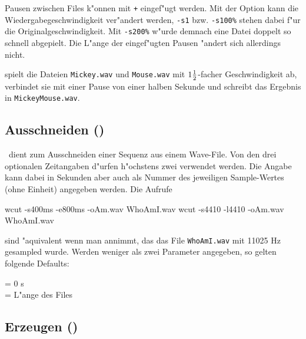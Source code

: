 Pausen zwischen Files k"onnen mit {\tt +} eingef"ugt
werden. Mit der Option  kann die 
Wiedergabegeschwindigkeit ver"andert werden, {\tt -s1} bzw.
{\tt -s100\%} stehen dabei f"ur die Originalgeschwindigkeit.
Mit {\tt -s200\%} w"urde demnach eine Datei doppelt so schnell
abgepielt. Die L"ange der eingef"ugten Pausen "andert sich
allerdings nicht.


\noindent spielt die Dateien {\tt Mickey.wav} und {\tt Mouse.wav}
mit $1{{1 \over 2}}$-facher Geschwindigkeit ab, verbindet sie
mit einer Pause von einer halben Sekunde und schreibt das
Ergebnis in {\tt MickeyMouse.wav}.


\subsection{Ausschneiden (\wcut)}



\wcut\ dient zum Ausschneiden einer Sequenz aus einem Wave-File.
Von den drei optionalen Zeitangaben d"urfen h"ochstens zwei 
verwendet werden. Die Angabe kann dabei in Sekunden aber auch als Nummer
des jeweiligen Sample-Wertes (ohne Einheit) angegeben werden. Die
Aufrufe

{\btxt
  wcut -s400ms -e800ms -oAm.wav WhoAmI.wav \txtund
  wcut -s4410 -l4410 -oAm.wav WhoAmI.wav
\etxt}

\noindent sind "aquivalent wenn man annimmt, das das File {\tt WhoAmI.wav}
mit 11025 Hz gesampled wurde. Werden weniger als zwei Parameter
angegeben, so gelten folgende Defaults:

{\btxt\rm
   = 0 s \\
   = L"ange des Files
\etxt}


\subsection{Erzeugen (\wfct)}



